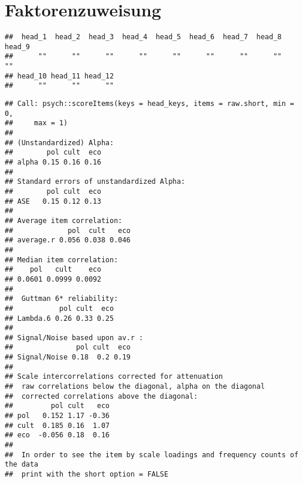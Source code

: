 \documentclass[]{article}
\begin{document}
\section{Faktorenzuweisung}\label{faktorenzuweisung}

\begin{verbatim}
##  head_1  head_2  head_3  head_4  head_5  head_6  head_7  head_8  head_9 
##      ""      ""      ""      ""      ""      ""      ""      ""      "" 
## head_10 head_11 head_12 
##      ""      ""      ""
\end{verbatim}

\begin{verbatim}
## Call: psych::scoreItems(keys = head_keys, items = raw.short, min = 0, 
##     max = 1)
## 
## (Unstandardized) Alpha:
##        pol cult  eco
## alpha 0.15 0.16 0.16
## 
## Standard errors of unstandardized Alpha:
##        pol cult  eco
## ASE   0.15 0.12 0.13
## 
## Average item correlation:
##             pol  cult   eco
## average.r 0.056 0.038 0.046
## 
## Median item correlation:
##    pol   cult    eco 
## 0.0601 0.0999 0.0092 
## 
##  Guttman 6* reliability: 
##           pol cult  eco
## Lambda.6 0.26 0.33 0.25
## 
## Signal/Noise based upon av.r : 
##               pol cult  eco
## Signal/Noise 0.18  0.2 0.19
## 
## Scale intercorrelations corrected for attenuation 
##  raw correlations below the diagonal, alpha on the diagonal 
##  corrected correlations above the diagonal:
##         pol cult   eco
## pol   0.152 1.17 -0.36
## cult  0.185 0.16  1.07
## eco  -0.056 0.18  0.16
## 
##  In order to see the item by scale loadings and frequency counts of the data
##  print with the short option = FALSE
\end{verbatim}
\end{document}
